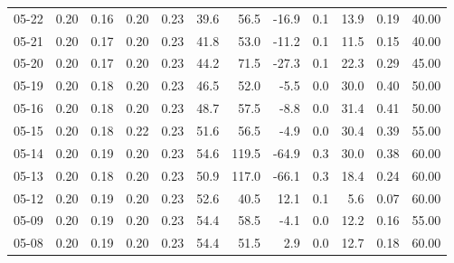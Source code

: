 \begin{threeparttable}
{\begin{tabular}{lrrrrrrrrrrr}
  05-22 &          0.20 &          0.16 &          0.20 &        0.23 &                39.6 &                56.5 &      -16.9 &                 0.1 &             13.9 &            0.19 &                  40.00 \\
  05-21 &          0.20 &          0.17 &          0.20 &        0.23 &                41.8 &                53.0 &      -11.2 &                 0.1 &             11.5 &            0.15 &                  40.00 \\
  05-20 &          0.20 &          0.17 &          0.20 &        0.23 &                44.2 &                71.5 &      -27.3 &                 0.1 &             22.3 &            0.29 &                  45.00 \\
  05-19 &          0.20 &          0.18 &          0.20 &        0.23 &                46.5 &                52.0 &       -5.5 &                 0.0 &             30.0 &            0.40 &                  50.00 \\
  05-16 &          0.20 &          0.18 &          0.20 &        0.23 &                48.7 &                57.5 &       -8.8 &                 0.0 &             31.4 &            0.41 &                  50.00 \\
  05-15 &          0.20 &          0.18 &          0.22 &        0.23 &                51.6 &                56.5 &       -4.9 &                 0.0 &             30.4 &            0.39 &                  55.00 \\
  05-14 &          0.20 &          0.19 &          0.20 &        0.23 &                54.6 &               119.5 &      -64.9 &                 0.3 &             30.0 &            0.38 &                  60.00 \\
  05-13 &          0.20 &          0.18 &          0.20 &        0.23 &                50.9 &               117.0 &      -66.1 &                 0.3 &             18.4 &            0.24 &                  60.00 \\
  05-12 &          0.20 &          0.19 &          0.20 &        0.23 &                52.6 &                40.5 &       12.1 &                 0.1 &              5.6 &            0.07 &                  60.00 \\
  05-09 &          0.20 &          0.19 &          0.20 &        0.23 &                54.4 &                58.5 &       -4.1 &                 0.0 &             12.2 &            0.16 &                  55.00 \\
  05-08 &          0.20 &          0.19 &          0.20 &        0.23 &                54.4 &                51.5 &        2.9 &                 0.0 &             12.7 &            0.18 &                  60.00 \\

\end{tabular}}
\end{threeparttable}
